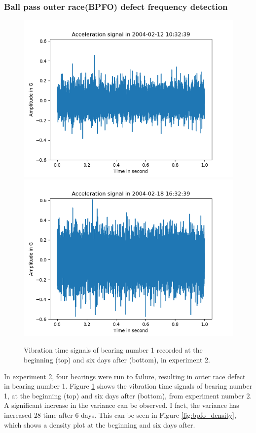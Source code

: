 \documentclass[../Main/thesis.tex]{subfiles}
\begin{document}
\subsubsection{Ball pass outer race(BPFO) defect frequency detection}
%
\begin{figure}[H]
	\centering
	\includegraphics[width=0.7\linewidth]{../fig/bpfo/first_day_signal_bpfo}
	\includegraphics[width=0.7\linewidth]{../fig/bpfo/last_day_signal_bpfo}
	\caption{Vibration time signals of bearing number 1 recorded at the beginning (top) and six days after (bottom), in experiment 2.}
	\label{fig:bpfo_signal}
\end{figure}
In experiment 2, four bearings were run to failure, resulting in outer race defect in bearing  number 1.
Figure \ref{fig:bpfo_signal} shows the vibration time signals of bearing number 1, at the beginning (top) and six days after (bottom), from experiment number 2. A significant increase in the variance can be observed.
I fact, the variance has increased 28 time after 6 days. This can be seen in Figure \ref{fig:bpfo_density}, which shows a density plot at the beginning and six days after.
\end{document}
